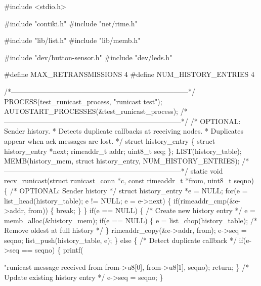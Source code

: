 \begin{DoxyCodeInclude}
\textcolor{preprocessor}{#include <stdio.h>}

\textcolor{preprocessor}{#include "contiki.h"}
\textcolor{preprocessor}{#include "net/rime.h"}

\textcolor{preprocessor}{#include "lib/list.h"}
\textcolor{preprocessor}{#include "lib/memb.h"}

\textcolor{preprocessor}{#include "dev/button-sensor.h"}
\textcolor{preprocessor}{#include "dev/leds.h"}

\textcolor{preprocessor}{#define MAX\_RETRANSMISSIONS 4}
\textcolor{preprocessor}{#define NUM\_HISTORY\_ENTRIES 4}

\textcolor{comment}{/*---------------------------------------------------------------------------*/}
PROCESS(test\_runicast\_process, \textcolor{stringliteral}{"runicast test"});
AUTOSTART\_PROCESSES(&test\_runicast\_process);
\textcolor{comment}{/*---------------------------------------------------------------------------*/}
\textcolor{comment}{/* OPTIONAL: Sender history.}
\textcolor{comment}{ * Detects duplicate callbacks at receiving nodes.}
\textcolor{comment}{ * Duplicates appear when ack messages are lost. */}
\textcolor{keyword}{struct }history\_entry \{
  \textcolor{keyword}{struct }history\_entry *next;
  rimeaddr\_t addr;
  uint8\_t seq;
\};
LIST(history\_table);
MEMB(history\_mem, \textcolor{keyword}{struct} history\_entry, NUM\_HISTORY\_ENTRIES);
\textcolor{comment}{/*---------------------------------------------------------------------------*/}
\textcolor{keyword}{static} \textcolor{keywordtype}{void}
recv\_runicast(\textcolor{keyword}{struct} runicast\_conn *c, \textcolor{keyword}{const} rimeaddr\_t *from, uint8\_t seqno)
\{
  \textcolor{comment}{/* OPTIONAL: Sender history */}
  \textcolor{keyword}{struct }history\_entry *e = NULL;
  \textcolor{keywordflow}{for}(e = list\_head(history\_table); e != NULL; e = e->next) \{
    \textcolor{keywordflow}{if}(rimeaddr\_cmp(&e->addr, from)) \{
      \textcolor{keywordflow}{break};
    \}
  \}
  \textcolor{keywordflow}{if}(e == NULL) \{
    \textcolor{comment}{/* Create new history entry */}
    e = memb\_alloc(&history\_mem);
    \textcolor{keywordflow}{if}(e == NULL) \{
      e = list\_chop(history\_table); \textcolor{comment}{/* Remove oldest at full history */}
    \}
    rimeaddr\_copy(&e->addr, from);
    e->seq = seqno;
    list\_push(history\_table, e);
  \} \textcolor{keywordflow}{else} \{
    \textcolor{comment}{/* Detect duplicate callback */}
    \textcolor{keywordflow}{if}(e->seq == seqno) \{
      printf(\textcolor{stringliteral}{"runicast message received from %
             from->u8[0], from->u8[1], seqno);
      \textcolor{keywordflow}{return};
    \}
    \textcolor{comment}{/* Update existing history entry */}
    e->seq = seqno;
  \}

}
\end{DoxyCodeInclude}
